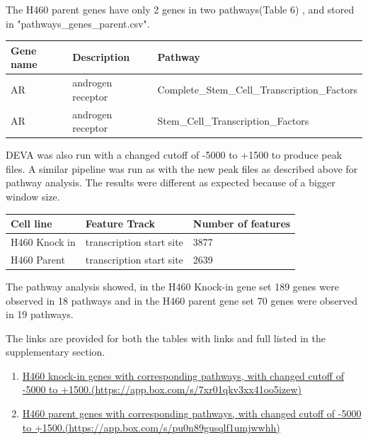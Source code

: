 \documentclass[11pt]{article}
\begin{document}
The H460 parent genes have only 2 genes in two pathways(Table 6) , and stored in "pathways\_genes\_parent.csv".

\begin{table}[H]
    \begin{tabular}{|l|l|l|}
    \hline
    {\bf Gene name} & {\bf Description}       & {\bf Pathway}                                  \\ \hline
    AR   & androgen receptor & Complete\_Stem\_Cell\_Transcription\_Factors \\ 
    AR   & androgen receptor & Stem\_Cell\_Transcription\_Factors       \\ \hline
    \end{tabular}
\end{table}



DEVA was also run with a changed cutoff of -5000 to +1500 to produce peak files. A similar pipeline was run as with the new peak files as described above for pathway analysis. The results were different as expected because of a bigger window size. 

\begin{table}[H]
\centering
	\begin{tabular}{|l|l|l|}
	\hline
		Cell line & Feature Track & Number of features \\ \hline
		H460 Knock in & transcription start site & 3877 \\ \hline
		H460 Parent & transcription start site & 2639 \\ \hline
	\end{tabular}
\end{table}

The pathway analysis showed, in the H460 Knock-in gene set 189 genes were observed in 18 pathways and in the H460 parent gene set 70 genes were observed in 19 pathways. 

The links are provided for both the tables with links and full listed in the supplementary section.

\begin{enumerate}

	\item \href{https://app.box.com/s/7xr01qkv3xx41oo5izew}{H460 knock-in genes with corresponding pathways, with changed cutoff of -5000 to +1500.(https://app.box.com/s/7xr01qkv3xx41oo5izew)} 
%	
	\item \href{https://app.box.com/s/pu0n89gusqlf1umjwwhh}{H460 parent genes with corresponding pathways,  with changed cutoff of -5000 to +1500.(https://app.box.com/s/pu0n89gusqlf1umjwwhh)}
\end{enumerate}
\end{document}
